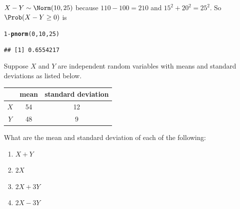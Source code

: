 \documentclass[twoside]{book}\usepackage[]{graphicx}\usepackage[]{xcolor}
\makeatletter
\newcommand{\hlnum}[1]{\textcolor[rgb]{0.686,0.059,0.569}{#1}}%
\newcommand{\hlopt}[1]{\textcolor[rgb]{0,0,0}{#1}}%
\newcommand{\hlstd}[1]{\textcolor[rgb]{0.345,0.345,0.345}{#1}}%
\newcommand{\hlkwd}[1]{\textcolor[rgb]{0.737,0.353,0.396}{\textbf{#1}}}%
\newenvironment{kframe}{%
 \def\at@end@of@kframe{}%
 \ifinner\ifhmode%
  \def\at@end@of@kframe{\end{minipage}}%
  \begin{minipage}{\columnwidth}%
 \fi\fi%
 \def\FrameCommand##1{\hskip\@totalleftmargin \hskip-\fboxsep
 \colorbox{shadecolor}{##1}\hskip-\fboxsep
     \hskip-\linewidth \hskip-\@totalleftmargin \hskip\columnwidth}%
 \MakeFramed {\advance\hsize-\width
   \@totalleftmargin\z@ \linewidth\hsize
   \@setminipage}}%
 {\par\unskip\endMakeFramed%
 \at@end@of@kframe}
\newenvironment{knitrout}{}{} %
\makeatother
\begin{document}
\begin{solution}
\begin{knitrout}
\begin{kframe}
\end{kframe}
\end{knitrout}
$X - Y \sim \Norm( 10, 25 )$ because $110 - 100 = 210$ and $15^2 + 20^2 = 25^2$.  
So $\Prob(X - Y \ge 0)$ is
\begin{knitrout}
\color{fgcolor}\begin{kframe}
\begin{alltt}
\hlnum{1} \hlopt{-} \hlkwd{pnorm}\hlstd{(}\hlnum{0}\hlstd{,} \hlnum{10}\hlstd{,} \hlnum{25}\hlstd{)}
\end{alltt}
\begin{verbatim}
## [1] 0.6554217
\end{verbatim}
\end{kframe}
\end{knitrout}
\end{solution}

\begin{problem}
	Suppose $X$ and $Y$ are independent random variables with means
	and standard deviations as listed below.

	\begin{center}
		\begin{tabular}{ccc}
			\hline
			& mean & standard deviation\\
			\hline
			$X$ & 54 & 12 \\
			$Y$ & 48 & 9 \\
			\hline
		\end{tabular}
	\end{center}

	What are the mean and standard deviation of each of the following:

	\begin{enumerate}
		\item $X + Y$
		\item $2X$
		\item $2X + 3Y$
		\item $2X - 3Y$
	\end{enumerate}
\end{problem}
\end{document}
